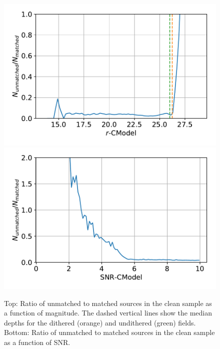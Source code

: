 \documentclass[a4paper,fleqn,usenatbib]{mnras}
\begin{document}
\begin{figure}
\centering
\includegraphics[width=0.9\columnwidth]{unmatched_fraction_magnitude.pdf}
\includegraphics[width=0.9\columnwidth]{unmatched_fraction_SNR.pdf}
\caption{Top: Ratio of unmatched to matched sources in the clean sample as a function of magnitude. The dashed vertical lines show the median depths for the dithered (orange) and undithered (green) fields. Bottom: Ratio of unmatched to matched sources in the clean sample as a function of SNR.}
\label{fig:snr_mag_selection}
\end{figure}
\end{document}
